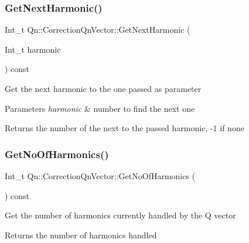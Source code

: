 \subsubsection{\texorpdfstring{Get\+Next\+Harmonic()}{GetNextHarmonic()}}
{\footnotesize\ttfamily Int\+\_\+t Qn\+::\+Correction\+Qn\+Vector\+::\+Get\+Next\+Harmonic (\begin{DoxyParamCaption}\item[{Int\+\_\+t}]{harmonic }\end{DoxyParamCaption}) const\hspace{0.3cm}{\ttfamily [inline]}}

Get the next harmonic to the one passed as parameter 
\begin{DoxyParams}{Parameters}
{\em harmonic} & number to find the next one \\
\hline
\end{DoxyParams}
\begin{DoxyReturn}{Returns}
the number of the next to the passed harmonic, -\/1 if none 
\end{DoxyReturn}
\mbox{\label{classQn_1_1CorrectionQnVector_a4da8a1b6a2f12c2393ae86b5fa19b0ae}} 
\subsubsection{\texorpdfstring{Get\+No\+Of\+Harmonics()}{GetNoOfHarmonics()}}
{\footnotesize\ttfamily Int\+\_\+t Qn\+::\+Correction\+Qn\+Vector\+::\+Get\+No\+Of\+Harmonics (\begin{DoxyParamCaption}{ }\end{DoxyParamCaption}) const}

Get the number of harmonics currently handled by the Q vector

\begin{DoxyReturn}{Returns}
the number of harmonics handled 
\end{DoxyReturn}
\mbox{\label{classQn_1_1CorrectionQnVector_a77ec3056318b215938cac926cd9cb3c2}} 
